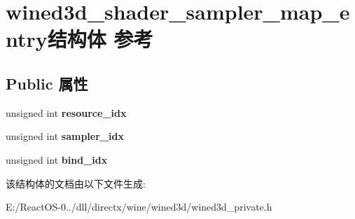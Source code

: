 \hypertarget{structwined3d__shader__sampler__map__entry}{}\section{wined3d\+\_\+shader\+\_\+sampler\+\_\+map\+\_\+entry结构体 参考}
\label{structwined3d__shader__sampler__map__entry}
\subsection*{Public 属性}
\begin{DoxyCompactItemize}
\item 
\mbox{\label{structwined3d__shader__sampler__map__entry_ad0799929ee10ed10524bb4fe7be3cee7}} 
unsigned int {\bfseries resource\+\_\+idx}
\item 
\mbox{\label{structwined3d__shader__sampler__map__entry_a34be0cb7b21a50b3e1902344e3f3f8c7}} 
unsigned int {\bfseries sampler\+\_\+idx}
\item 
\mbox{\label{structwined3d__shader__sampler__map__entry_abfeb19ea3cf4ddff3f34c32e5e18cd0b}} 
unsigned int {\bfseries bind\+\_\+idx}
\end{DoxyCompactItemize}


该结构体的文档由以下文件生成\+:\begin{DoxyCompactItemize}
\item 
E\+:/\+React\+O\+S-\/0../dll/directx/wine/wined3d/wined3d\+\_\+private.\+h\end{DoxyCompactItemize}
